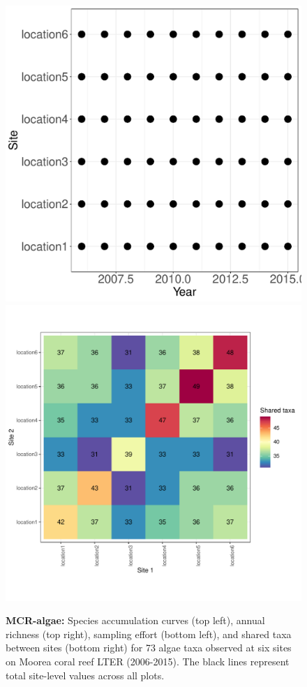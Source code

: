 \documentclass[11pt, oneside]{article}
\begin{document}
\begin{figure}[h!]
\includegraphics[scale = 0.4]{mcr-algae-castorani_spatiotemporal_sampling_effort.pdf}
\includegraphics[scale = 0.4]{mcr-algae-castorani_spp_shared.pdf}
\caption{{\bf MCR-algae:} Species accumulation curves (top left),  annual richness (top right), sampling effort (bottom left), and shared taxa between sites (bottom right) for 73 algae taxa observed at six sites on Moorea coral reef LTER (2006-2015). The black lines represent total site-level values across all plots.}
\label{mcr-algae}
\end{figure}
%
%
\end{document}
